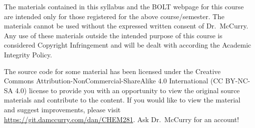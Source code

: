 \documentclass[11pt,letterpaper]{article}
\begin{document}
\vfill

\begin{mdframed}
	\noindent
	The materials contained in this syllabus and the
	BOLT webpage for this course are intended only for those registered for
	the above course/semester. The materials cannot be used without the
	expressed written consent of Dr.\ McCurry. Any use of these materials
	outside the intended purpose of this course is considered Copyright
	Infringement and will be dealt with according the Academic Integrity
	Policy.  

	\noindent
	The source code for some material has been licensed under the Creative
	Commons Attribution-NonCommercial-ShareAlike 4.0 International (CC
	BY-NC-SA 4.0) license to provide you with an opportunity to view the
	original source materials and contribute to the content. If you would
	like to view the material and suggest improvements, please visit
	\url{https://git.damccurry.com/dan/CHEM281}. Ask Dr.\ McCurry for an
	account!
\end{mdframed}
\end{document}
